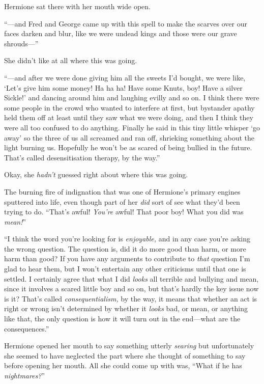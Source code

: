 Hermione sat there with her mouth wide open.

“—and Fred and George came up with this spell to make the scarves over our faces darken and blur, like we were undead kings and those were our grave shrouds—”

She didn’t like at all where this was going.

“—and after we were done giving him all the sweets I’d bought, we were like, ‘Let’s give him some money! Ha ha ha! Have some Knuts, boy! Have a silver Sickle!’ and dancing around him and laughing evilly and so on. I think there were some people in the crowd who wanted to interfere at first, but bystander apathy held them off at least until they saw what we were doing, and then I think they were all too confused to do anything. Finally he said in this tiny little whisper ‘go away’ so the three of us all screamed and ran off, shrieking something about the light burning us. Hopefully he won’t be as scared of being bullied in the future. That’s called desensitisation therapy, by the way.”

Okay, she \emph{hadn’t} guessed right about where this was going.

The burning fire of indignation that was one of Hermione’s primary engines sputtered into life, even though part of her \emph{did} sort of see what they’d been trying to do. “That’s awful! \emph{You’re} awful! That poor boy! What you did was \emph{mean!}”

“I think the word you’re looking for is \emph{enjoyable,} and in any case you’re asking the wrong question. The question is, did it do more good than harm, or more harm than good? If you have any arguments to contribute to \emph{that} question I’m glad to hear them, but I won’t entertain any other criticisms until that one is settled. I certainly agree that what I did \emph{looks} all terrible and bullying and mean, since it involves a scared little boy and so on, but that’s hardly the key issue now is it? That’s called \emph{consequentialism,} by the way, it means that whether an act is right or wrong isn’t determined by whether it \emph{looks} bad, or mean, or anything like that, the only question is how it will turn out in the end—what are the consequences.”

Hermione opened her mouth to say something utterly \emph{searing} but unfortunately she seemed to have neglected the part where she thought of something to say before opening her mouth. All she could come up with was, “What if he has \emph{nightmares?}”

